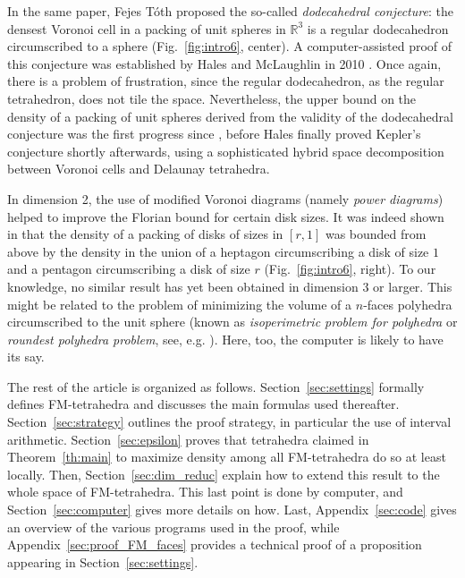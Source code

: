 \documentclass[11pt]{article}
\begin{document}
In the same paper, Fejes T\'oth proposed the so-called {\em dodecahedral conjecture}: the densest Voronoi cell in a packing of unit spheres in $\mathbb{R}^3$ is a regular dodecahedron circumscribed to a sphere (Fig.~\ref{fig:intro6}, center).
A computer-assisted proof of this conjecture was established by Hales and McLaughlin in 2010 \cite{HL10}.
Once again, there is a problem of frustration, since the regular dodecahedron, as the regular tetrahedron, does not tile the space.
Nevertheless, the upper bound on the density of a packing of unit spheres derived from the validity of the dodecahedral conjecture was the first progress since \cite{Rog58}, before Hales finally proved Kepler's conjecture shortly afterwards, using a sophisticated hybrid space decomposition between Voronoi cells and Delaunay tetrahedra.

In dimension 2, the use of modified Voronoi diagrams (namely {\em power diagrams}) helped to improve the Florian bound for certain disk sizes.
It was indeed shown in \cite{Bli69} that the density of a packing of disks of sizes in $[r,1]$ was bounded from above by the density in the union of a heptagon circumscribing a disk of size $1$ and a pentagon circumscribing a disk of size $r$ (Fig.~\ref{fig:intro6}, right).
To our knowledge, no similar result has yet been obtained in dimension $3$ or larger.
This might be related to the problem of minimizing the volume of a $n$-faces polyhedra circumscribed to the unit sphere (known as {\em isoperimetric problem for polyhedra} or {\em roundest polyhedra problem}, see, e.g. \cite{Gol35}).
Here, too, the computer is likely to have its say.

The rest of the article is organized as follows.
Section~\ref{sec:settings} formally defines FM-tetrahedra and discusses the main formulas used thereafter.
Section~\ref{sec:strategy} outlines the proof strategy, in particular the use of interval arithmetic.
Section~\ref{sec:epsilon} proves that tetrahedra claimed in Theorem~\ref{th:main} to maximize density among all FM-tetrahedra do so at least locally.
Then, Section~\ref{sec:dim_reduc} explain how to extend this result to the whole space of FM-tetrahedra.
This last point is done by computer, and Section~\ref{sec:computer} gives more details on how.
Last, Appendix~\ref{sec:code} gives an overview of the various programs used in the proof, while Appendix~\ref{sec:proof_FM_faces} provides a technical proof of a proposition appearing in Section~\ref{sec:settings}.

\end{document}
